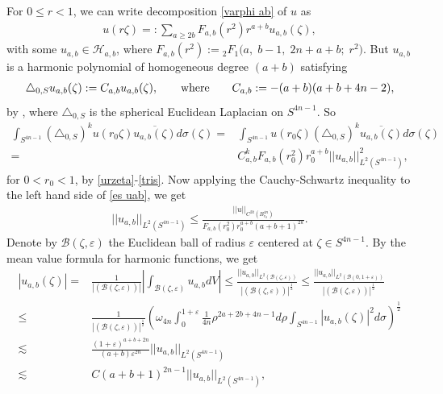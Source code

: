 \documentclass[a4paper,11pt]{amsart}
\numberwithin{equation}{section}
\begin{document}
  For $0\leq r<1$, we can write decomposition \eqref{varphi ab} of $u$ as
\begin{equation}\begin{aligned}\label{urzeta}
u(r\zeta)=:\sum_{a\geq 2b}F_{a,b}(r^2)r^{a+b}u_{a,b}(\zeta),
\end{aligned}\end{equation}
with some $u_{a,b}\in \mathcal{H}_{a,b}$, where $F_{a,b}(r^2):={}_2F_1\bigl(a,\; b-1,\; 2n+a+b;\; r^2\bigr)$. But $u_{a,b}$ is a harmonic polynomial of homogeneous degree $(a+b)$ satisfying
\begin{equation}\begin{aligned}\label{tris}
\triangle_{0,S}u_{a,b}(\zeta):=C_{a,b}u_{a,b}(\zeta),\qquad{\rm where}\qquad C_{a,b}:=-(a+b)(a+b+4n-2),
\end{aligned}\end{equation}
by \cite[Section 3.1.4]{Stein}, where $\triangle_{0,S}$ is the spherical Euclidean Laplacian on $S^{4n-1}$. So
\begin{equation}\begin{aligned}\label{es uab}
\int_{S^{4n-1}}\left(\triangle_{0,S}\right)^{k} u(r_0\zeta)\overline{u_{a,b}(\zeta)}d\sigma(\zeta)=&\int_{S^{4n-1}}u(r_0\zeta)\left(\triangle_{0,S}\right)^{k}\overline{u_{a,b}(\zeta)}d\sigma(\zeta)\\
=&C_{a,b}^{k}F_{a,b}(r_0^2)r_0^{a+b}||u_{a,b}||_{L^2(S^{4n-1})}^2,
\end{aligned}\end{equation}
for $0<r_0<1$, by \eqref{urzeta}-\eqref{tris}.
Now applying the Cauchy-Schwartz inequality to the left hand side of \eqref{es uab}, we get
\begin{equation}\begin{aligned}\label{L2 es}
||u_{a,b}||_{L^2(S^{4n-1})}\leq\frac{||u||_{C^{2k}(B^{4n}_{r_0})}}{F_{a,b}(r_0^2)r_0^{a+b}(a+b+1)^{2k}}.
\end{aligned}\end{equation}
Denote by $\mathcal{B}(\zeta,\varepsilon)$ the Euclidean ball of radius $\varepsilon$ centered at $\zeta\in S^{4n-1}$. By the mean value formula for harmonic functions, we get
\begin{equation}\begin{aligned}\label{L1 es}
|u_{a,b}(\zeta)|=&\frac{1}{|(\mathcal{B}(\zeta,\varepsilon))|}\left|\int_{\mathcal{B}(\zeta,\varepsilon)}u_{a,b}dV\right|
\leq \frac{||u_{a,b}||_{L^2(\mathcal{B}(\zeta,\varepsilon))}}{|(\mathcal{B}(\zeta,\varepsilon))|^{\frac12}}\leq\frac{||u_{a,b}||_{L^2(\mathcal{B}(0,1+\varepsilon))}}{|(\mathcal{B}(\zeta,\varepsilon))|^{\frac12}}\\
\leq& \frac{1}{|(\mathcal{B}(\zeta,\varepsilon))|^{\frac12}}\left(\omega_{4n}\int_0^{1+\varepsilon}\frac{1}{4n}\rho^{2a+2b+4n-1}d\rho\int_{S^{4n-1}}|u_{a,b}(\zeta)|^2 d\sigma\right)^{\frac12}\\
\lesssim&\frac{(1+\varepsilon)^{a+b+2n}}{(a+b)\varepsilon^{2n}} ||u_{a,b}||_{L^2(S^{4n-1})}\\
\lesssim&C (a+b+1)^{2n-1}||u_{a,b}||_{L^2(S^{4n-1})},
\end{aligned}\end{equation}
\end{document}

